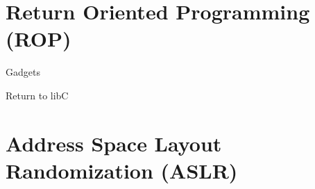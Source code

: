 \documentclass[beamer]{uibk}
\begin{document}
\section{Return Oriented Programming (ROP)}

\begin{frame}{Gadgets}

\end{frame}

\begin{frame}{Return to libC}

\end{frame}

\section{Address Space Layout Randomization (ASLR)}
\end{document}
